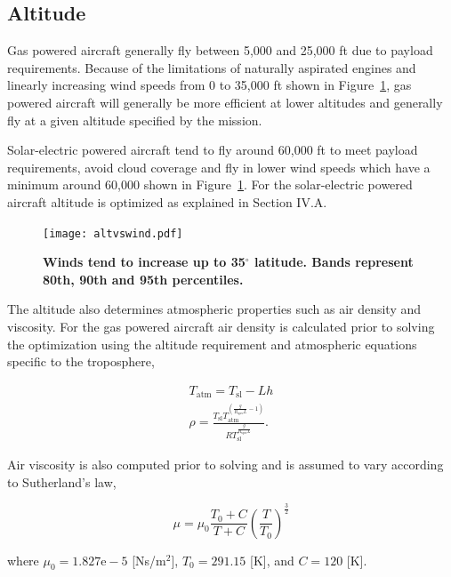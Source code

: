 \subsection{Altitude}

Gas powered aircraft generally fly between 5,000 and 25,000 ft due to payload requirements.  
Because of the limitations of naturally aspirated engines and linearly increasing wind speeds from 0 to 35,000 ft shown in Figure~\ref{f:altvswind}, gas powered aircraft will generally be more efficient at lower altitudes and generally fly at a given altitude specified by the mission.  

Solar-electric powered aircraft tend to fly around 60,000 ft to meet payload requirements, avoid cloud coverage and fly in lower wind speeds which have a minimum around 60,000 shown in Figure~\ref{f:altvswind}.  For the solar-electric powered aircraft altitude is optimized as explained in Section IV.A. 

\begin{figure}[H]
	\begin{center}
	\texttt{[image: altvswind.pdf]}
    \caption{\textbf{Winds tend to increase up to 35$^{\circ}$ latitude. Bands represent 80th, 90th and 95th percentiles.}}
	\label{f:altvswind}
	\end{center}
\end{figure}

The altitude also determines atmospheric properties such as air density and viscosity.  For the gas powered aircraft air density is calculated prior to solving the optimization using the altitude requirement and atmospheric equations specific to the troposphere,\cite{isaatm} 

\begin{align}
    \label{e:Talt}
    T_{\text{atm}} = T_{\text{sl}} - Lh \\
    \label{e:rhot}
    \rho = \frac{T_{\text{sl}}T_{\text{atm}}^{\left( \frac{g}{R_{\text{spec}}L} -1 \right)}}{R T_{\text{sl}}^{\frac{g}{R_{\text{spec}}L}}}.
\end{align}

Air viscosity is also computed prior to solving and is assumed to vary according to Sutherland's law,\cite{fluiddyhandbook}

\begin{equation}
    \label{e:sutherland}
    \mu = \mu_0 \frac{T_0 + C}{T+C} \left( \frac{T}{T_0} \right)^{\frac{3}{2}}
\end{equation}

where $\mu_0 = 1.827\text{e}-5$ [Ns/m$^2$], $T_0 = 291.15$ [K], and $C = 120$ [K]. \\

